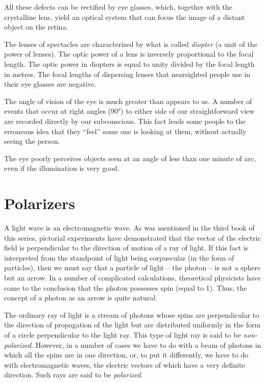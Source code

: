 All these defects can be rectified by eye glasses, which, together with the crystalline lens, yield an optical system that can focus the image of a distant object on the retina.

The lenses of spectacles are characterized by what is called \emph{diopter} (a unit of the power of lenses). The optic power of a lens is inversely proportional to the focal length. The optic power in diopters is equal to unity divided by the focal length in metres. The focal lengths of dispersing lenses that nearsighted people use in their eye glasses are negative.

The angle of vision of the eye is much greater than appears to us. A number of events that occur at right angles (\ang{90}) to either side of our straightforward view are recorded directly by our subconscious. This fact leads some people to the erroneous idea that they ``feel'' some­ one is looking at them, without actually seeing the person.

The eye poorly perceives objects seen at an angle of less than one minute of arc, even if the illumination is very good.

\section{Polarizers}

A light wave is an electromagnetic wave. As was men­tioned in the third book of this series, pictorial experi­ments have demonstrated that the vector of the electric field is perpendicular to the direction of motion of a ray of light. If this fact is interpreted from the standpoint of light being corpuscular (in the form of particles), then we must say that a particle of light -- the photon -- is not a sphere but an arrow. In a number of complicated cal­culations, theoretical physicists have come to the con­clusion that the photon possesses spin (equal to 1). Thus, the concept of a photon as an arrow is quite natural.


The ordinary ray of light is a stream of photons whose spins are perpendicular to the direction of propagation of the light but are distributed uniformly in the form of a circle perpendicular to the light ray. This type of light ray is said to be \emph{non-polarized}. However, in a number of cases we have to do with a beam of photons in which all the spins are in one direction, or, to put it differently, we have to do with electromagnetic waves, the electric vectors of which have a very definite direction. Such rays are said to be \emph{polarized}.

